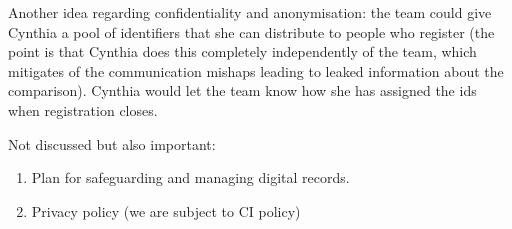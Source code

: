 Another idea regarding confidentiality and anonymisation: the team could give Cynthia a pool of identifiers that she can distribute to people who register (the point is that Cynthia does this completely independently of the team, which mitigates of the communication mishaps leading to leaked information about the comparison). Cynthia would let the team know how she has assigned the ids when registration closes.
 

Not discussed but also important: 
\begin{enumerate}
\item	Plan for safeguarding and managing digital records.
\item	Privacy policy (we are subject to CI policy)
\end{enumerate}